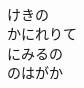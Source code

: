 \documentclass[10pt,b5j]{tarticle} %
\begin{document}
\begin{enumerate}
\begin{minipage}[c]{\blocksize}
        \vspace{\linespace}
        \item~\\
        けきの\\
        かにれりて\\
        にみるの\\
        のはがか
    
    \end{minipage}
\end{enumerate} %
\end{document}
